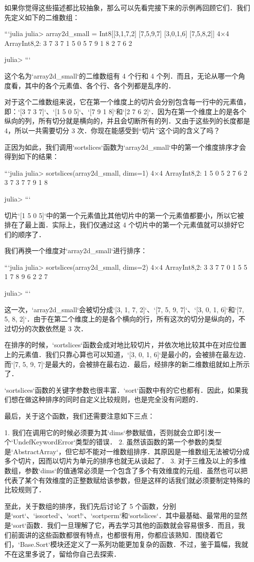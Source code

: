 如果你觉得这些描述都比较抽象，那么可以先看完接下来的示例再回顾它们．我们先定义如下的二维数组：

```julia
julia> array2d_small = Int8[[3,1,7,2] [7,5,9,7] [3,0,1,6] [7,5,8,2]]
4×4 Array{Int8,2}:
 3  7  3  7
 1  5  0  5
 7  9  1  8
 2  7  6  2

julia> 
```

这个名为`array2d_small`的二维数组有 4 个行和 4 个列．而且，无论从哪一个角度看，其中的各个元素值、各个行、各个列都是乱序的．

对于这个二维数组来说，它在第一个维度上的切片会分别包含每一行中的元素值，即：`[3 7 3 7]`、`[1 5 0 5]`、`[7 9 1 8]`和`[2 7 6 2]`．因为在第一个维度上的是各个纵向的列，所有切分就是横向的，并且会切断所有的列．又由于这些列的长度都是 4，所以一共需要切分 3 次．你现在能感受到“切片”这个词的含义了吗？

正因为如此，我们调用`sortslices`函数为`array2d_small`中的第一个维度排序才会得到如下的结果：

```julia
julia> sortslices(array2d_small, dims=1)
4×4 Array{Int8,2}:
 1  5  0  5
 2  7  6  2
 3  7  3  7
 7  9  1  8

julia> 
```

切片`[1 5 0 5]`中的第一个元素值比其他切片中的第一个元素值都要小，所以它被排在了最上面．实际上，我们仅通过这 4 个切片中的第一个元素值就可以排好它们的顺序了．

我们再换一个维度对`array2d_small`进行排序：

```julia
julia> sortslices(array2d_small, dims=2)
4×4 Array{Int8,2}:
 3  3  7  7
 0  1  5  5
 1  7  8  9
 6  2  2  7

julia> 
```

这一次，`array2d_small`会被切分成`[3, 1, 7, 2]`、`[7, 5, 9, 7]`、`[3, 0, 1, 6]`和`[7, 5, 8, 2]`．由于在第二个维度上的是各个横向的行，所有这次的切分是纵向的，不过切分的次数依然是 3 次．

在排序的时候，`sortslices`函数会成对地比较切片，并依次地比较其中在对应位置上的元素值．我们只靠心算也可以知道，`[3, 0, 1, 6]`是最小的，会被排在最左边．而`[7, 5, 9, 7]`是最大的，会被排在最右边．最后，经排序的新二维数组就如上所示了．

`sortslices`函数的关键字参数也很丰富．`sort`函数中有的它也都有．因此，如果我们想在做这种排序的同时自定义比较规则，也是完全没有问题的．

最后，关于这个函数，我们还需要注意如下三点：

1. 我们在调用它的时候必须要为其`dims`参数赋值，否则就会立即引发一个`UndefKeywordError`类型的错误．
2. 虽然该函数的第一个参数的类型是`AbstractArray`，但它却不能对一维数组排序．其原因是一维数组无法被切分成多个切片，因而以切片为单元的排序也就无从谈起了．
3. 对于三维及以上的多维数组，参数`dims`的值通常必须是一个包含了多个有效维度的元组．虽然也可以把代表了某个有效维度的正整数赋给该参数，但是这样的话我们就必须要制定特殊的比较规则了．

至此，关于数组的排序，我们先后讨论了 5 个函数，分别是`sort`、`issorted`、`sort!`、`sortperm`和`sortslices`．其中最基础、最常用的显然是`sort`函数．我们一旦理解了它，再去学习其他的函数就会容易很多．而且，我们前面讲的这些函数都很有特点，也都很有用，你都应该熟知．围绕着它们，`Base.Sort`模块还定义了一系列功能更加复杂的函数．不过，鉴于篇幅，我就不在这里多说了，留给你自己去探索．
